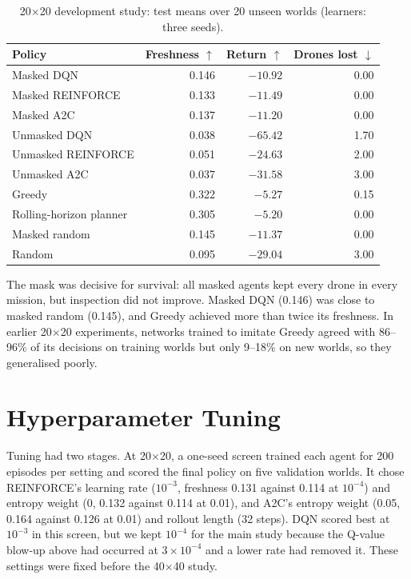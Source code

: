 \begin{table}[!t]
\centering
\caption{20$\times$20 development study: test means over 20 unseen worlds (learners: three
seeds).}
\label{tab:dev}
\scriptsize
\setlength{\tabcolsep}{5pt}
\begin{tabular}{lrrr}
\toprule
Policy & Freshness $\uparrow$ & Return $\uparrow$ & Drones lost $\downarrow$ \\
\midrule
Masked DQN & 0.146 & $-10.92$ & 0.00 \\
Masked REINFORCE & 0.133 & $-11.49$ & 0.00 \\
Masked A2C & 0.137 & $-11.20$ & 0.00 \\
Unmasked DQN & 0.038 & $-65.42$ & 1.70 \\
Unmasked REINFORCE & 0.051 & $-24.63$ & 2.00 \\
Unmasked A2C & 0.037 & $-31.58$ & 3.00 \\
\midrule
Greedy & 0.322 & $-5.27$ & 0.15 \\
Rolling-horizon planner & 0.305 & $-5.20$ & 0.00 \\
Masked random & 0.145 & $-11.37$ & 0.00 \\
Random & 0.095 & $-29.04$ & 3.00 \\
\bottomrule
\end{tabular}
\end{table}

The mask was decisive for survival: all masked agents kept every drone in every mission, but
inspection did not improve. Masked DQN (0.146) was close to masked random (0.145), and Greedy
achieved more than twice its freshness. In earlier 20$\times$20 experiments, networks trained
to imitate Greedy agreed with 86--96\% of its decisions on training worlds but only 9--18\% on
new worlds, so they generalised poorly.

\section{Hyperparameter Tuning}

Tuning had two stages. At 20$\times$20, a one-seed screen trained each agent for 200 episodes
per setting and scored the final policy on five validation worlds. It chose REINFORCE's
learning rate ($10^{-3}$, freshness 0.131 against 0.114 at $10^{-4}$) and entropy weight (0,
0.132 against 0.114 at 0.01), and A2C's entropy weight (0.05, 0.164 against 0.126 at 0.01) and
rollout length (32 steps). DQN scored best at $10^{-3}$ in this screen, but we kept
$10^{-4}$ for the main study because the Q-value blow-up above had occurred at
$3\times10^{-4}$ and a lower rate had removed it.
These settings were fixed before the 40$\times$40 study.

